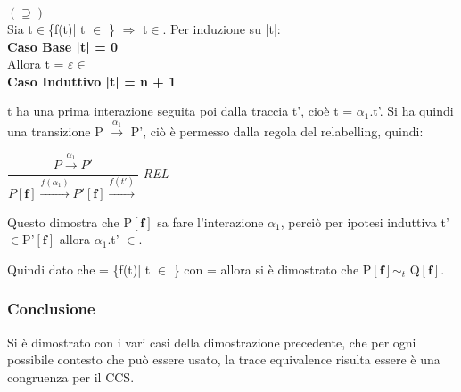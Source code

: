 $(\supseteq)$ \\

Sia t$\in$\{f(t)| t $\in$ \}  $\Rightarrow$ t$\in$. Per induzione su |t|:\\

\textbf{Caso Base |t| = 0}
\\
Allora t = $\varepsilon \in$
\\

\textbf{Caso Induttivo |t| = n + 1}

t ha una prima interazione seguita poi dalla traccia t', cioè t = $\alpha_{1}$.t'. Si ha quindi una transizione P $\overset{\alpha_{1}}\rightarrow$ P', ciò è permesso dalla regola del relabelling, quindi:

$\dfrac{P \overset{\alpha_{1}}\rightarrow P'}{P \mathbf{[f]} \overset{f(\alpha_{1})}\rightarrow P'\mathbf{[f]}\overset{f(t')}\rightarrow}$ \textit{REL} 

Questo dimostra che P$\mathbf{[f]}$ sa fare l'interazione $\alpha_{1}$, perciò per ipotesi induttiva t'$\in$P'$\mathbf{[f]}$ allora $\alpha_{1}$.t' $\in$.

Quindi dato che  = \{f(t)| t $\in$ \} con  =  allora si è dimostrato che  P$\mathbf{[f]}\sim_{t}$ Q$\mathbf{[f]}$.

\subsubsection{Conclusione}
Si è dimostrato con i vari casi della dimostrazione precedente, che per ogni possibile contesto che può essere usato, la trace equivalence risulta essere è una congruenza per il CCS. 
\pagebreak